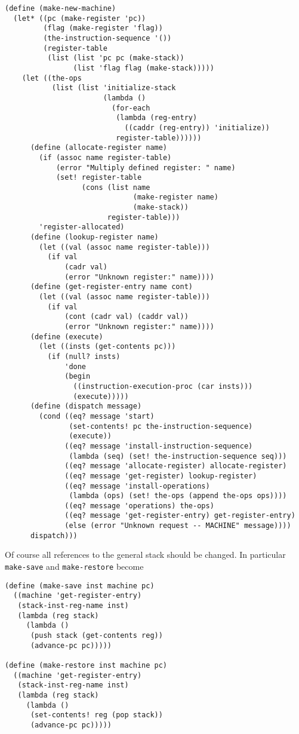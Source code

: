 \documentclass[a4paper,12pt]{article}
\begin{document}
\begin{lstlisting}
(define (make-new-machine)
  (let* ((pc (make-register 'pc))
         (flag (make-register 'flag))
         (the-instruction-sequence '())
         (register-table
          (list (list 'pc pc (make-stack))
                (list 'flag flag (make-stack)))))
    (let ((the-ops
           (list (list 'initialize-stack
                       (lambda ()
                         (for-each
                          (lambda (reg-entry)
                            ((caddr (reg-entry)) 'initialize))
                          register-table))))))
      (define (allocate-register name)
        (if (assoc name register-table)
            (error "Multiply defined register: " name)
            (set! register-table
                  (cons (list name
                              (make-register name)
                              (make-stack))
                        register-table)))
        'register-allocated)
      (define (lookup-register name)
        (let ((val (assoc name register-table)))
          (if val
              (cadr val)
              (error "Unknown register:" name))))
      (define (get-register-entry name cont)
        (let ((val (assoc name register-table)))
          (if val
              (cont (cadr val) (caddr val))
              (error "Unknown register:" name))))
      (define (execute)
        (let ((insts (get-contents pc)))
          (if (null? insts)
              'done
              (begin
                ((instruction-execution-proc (car insts)))
                (execute)))))
      (define (dispatch message)
        (cond ((eq? message 'start)
               (set-contents! pc the-instruction-sequence)
               (execute))
              ((eq? message 'install-instruction-sequence)
               (lambda (seq) (set! the-instruction-sequence seq)))
              ((eq? message 'allocate-register) allocate-register)
              ((eq? message 'get-register) lookup-register)
              ((eq? message 'install-operations)
               (lambda (ops) (set! the-ops (append the-ops ops))))
              ((eq? message 'operations) the-ops)
              ((eq? message 'get-register-entry) get-register-entry)
              (else (error "Unknown request -- MACHINE" message))))
      dispatch)))
\end{lstlisting}

Of course all references to the general stack should be changed.  In
particular \lstinline!make-save! and \lstinline!make-restore! become

\begin{lstlisting}
(define (make-save inst machine pc)
  ((machine 'get-register-entry)
   (stack-inst-reg-name inst)
   (lambda (reg stack)
     (lambda ()
      (push stack (get-contents reg))
      (advance-pc pc)))))

(define (make-restore inst machine pc)
  ((machine 'get-register-entry)
   (stack-inst-reg-name inst)
   (lambda (reg stack)
     (lambda ()
      (set-contents! reg (pop stack))
      (advance-pc pc)))))
\end{lstlisting}
\end{document}
